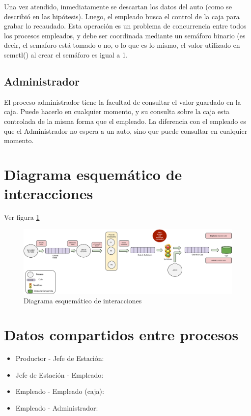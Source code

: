 \documentclass[12pt,a4paper,spanish]{article}
\begin{document}
	Una vez atendido, inmediatamente se descartan los datos del auto (como se describió en las hipótesis). Luego, el empleado busca el control de la caja para grabar lo recaudado. Esta operación es un problema de concurrencia entre todos los procesos empleados, y debe ser coordinada mediante un semáforo binario (es decir, el semaforo está tomado o no, o lo que es lo mismo, el valor utilizado en semctl() al crear el semáforo es igual a 1.
	
	\subsection{Administrador}
	
	El proceso administrador tiene la facultad de consultar el valor guardado en la caja. Puede hacerlo en cualquier momento, y su consulta sobre la caja esta controlada de la misma forma que el empleado. La diferencia con el empleado es que el Administrador no espera a un auto, sino que puede consultar en cualquier momento.
	
	\section{Diagrama esquemático de interacciones}
	
	Ver figura \ref{diagrama}

\begin{figure}
\label{diagrama}
\includegraphics[width=1.0\textwidth]{esquema.png}
\caption{Diagrama esquemático de interacciones}
\end{figure}

	\section{Datos compartidos entre procesos}
	
	\begin{itemize}
	
	\item Productor - Jefe de Estación:
	
	\item Jefe de Estación - Empleado:
	
	\item Empleado - Empleado (caja):
	
	\item Empleado - Administrador:
	
	\end{itemize}
\end{document}
